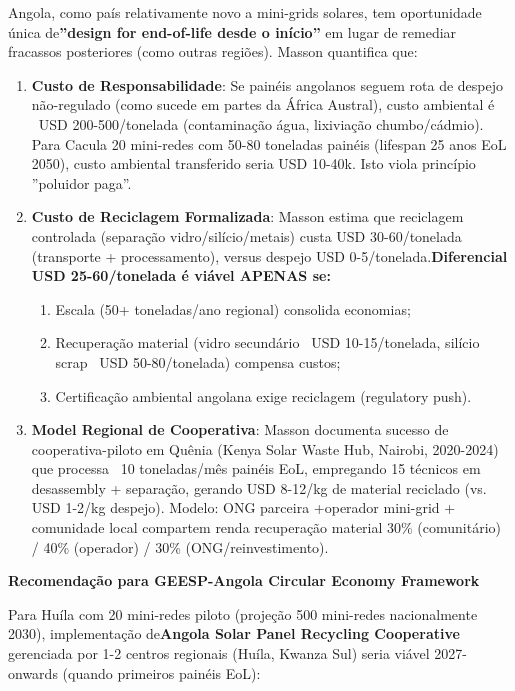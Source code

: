 \documentclass[12pt, a4paper]{article}
\begin{document}
Angola, como país relativamente novo a mini-grids solares, tem oportunidade única de\textbf{''design for end-of-life desde o início''} em lugar de remediar fracassos posteriores (como outras regiões). Masson quantifica que:

\begin{enumerate}
\item \textbf{Custo de Responsabilidade}: Se painéis angolanos seguem rota de despejo não-regulado (como sucede em partes da África Austral), custo ambiental é ~USD 200-500/tonelada (contaminação água, lixiviação chumbo/cádmio). Para Cacula 20 mini-redes com 50-80 toneladas painéis (lifespan 25 anos EoL 2050), custo ambiental transferido seria USD 10-40k. Isto viola princípio ''poluidor paga''.

\item \textbf{Custo de Reciclagem Formalizada}: Masson estima que reciclagem controlada (separação vidro/silício/metais) custa USD 30-60/tonelada (transporte + processamento), versus despejo USD 0-5/tonelada.\textbf{Diferencial USD 25-60/tonelada é viável APENAS se:}
  \begin{enumerate}
  \item Escala (50+ toneladas/ano regional) consolida economias;
  \item Recuperação material (vidro secundário ~USD 10-15/tonelada, silício scrap ~USD 50-80/tonelada) compensa custos;
  \item Certificação ambiental angolana exige reciclagem (regulatory push).
  \end{enumerate}

\item \textbf{Model Regional de Cooperativa}: Masson documenta sucesso de cooperativa-piloto em Quênia (Kenya Solar Waste Hub, Nairobi, 2020-2024) que processa ~10 toneladas/mês painéis EoL, empregando 15 técnicos em desassembly + separação, gerando USD 8-12/kg de material reciclado (vs. USD 1-2/kg despejo). Modelo: ONG parceira +operador mini-grid + comunidade local compartem renda recuperação material 30\% (comunitário) / 40\% (operador) / 30\% (ONG/reinvestimento).

\end{enumerate}

\textbf{Recomendação para GEESP-Angola Circular Economy Framework}

Para Huíla com 20 mini-redes piloto (projeção 500 mini-redes nacionalmente 2030), implementação de\textbf{Angola Solar Panel Recycling Cooperative} gerenciada por 1-2 centros regionais (Huíla, Kwanza Sul) seria viável 2027-onwards (quando primeiros painéis EoL):
\end{document}
